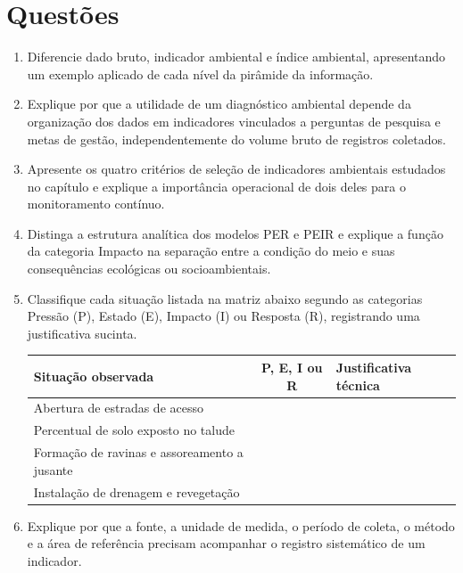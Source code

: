 \documentclass[11pt,a4paper]{article}
\begin{document}
\section{Questões}

\begin{enumerate}[leftmargin=*, itemsep=6pt]
  \item Diferencie dado bruto, indicador ambiental e índice ambiental, apresentando um exemplo aplicado de cada nível da pirâmide da informação.

  \item Explique por que a utilidade de um diagnóstico ambiental depende da organização dos dados em indicadores vinculados a perguntas de pesquisa e metas de gestão, independentemente do volume bruto de registros coletados.

  \item Apresente os quatro critérios de seleção de indicadores ambientais estudados no capítulo e explique a importância operacional de dois deles para o monitoramento contínuo.

  \item Distinga a estrutura analítica dos modelos PER e PEIR e explique a função da categoria Impacto na separação entre a condição do meio e suas consequências ecológicas ou socioambientais.

  \item Classifique cada situação listada na matriz abaixo segundo as categorias Pressão (P), Estado (E), Impacto (I) ou Resposta (R), registrando uma justificativa sucinta.

  \vspace{4pt}
  \renewcommand{\arraystretch}{1.35}
  \begin{tabularx}{\linewidth}{|p{5.5cm}|c|X|}
  \hline
  \rowcolor{uefsgray}
  \textbf{Situação observada} & \textbf{P, E, I ou R} & \textbf{Justificativa técnica} \\
  \hline
  Abertura de estradas de acesso & & \\
  \hline
  Percentual de solo exposto no talude & & \\
  \hline
  Formação de ravinas e assoreamento a jusante & & \\
  \hline
  Instalação de drenagem e revegetação & & \\
  \hline
  \end{tabularx}
  \vspace{4pt}

  \item Explique por que a fonte, a unidade de medida, o período de coleta, o método e a área de referência precisam acompanhar o registro sistemático de um indicador.


\end{enumerate}
\end{document}
